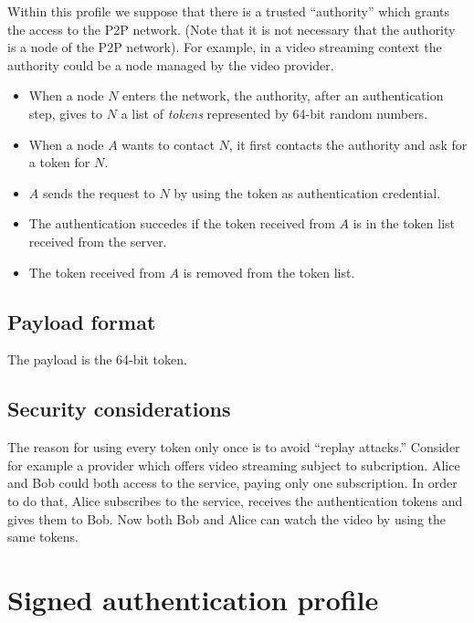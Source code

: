 \documentclass{rfc}
\begin{document}
Within this profile we suppose that there is a trusted ``authority''
which grants the access to the P2P network.  (Note that it is not
necessary that the authority is a node of the P2P network).  For
example, in a video streaming context the authority could be a node
managed by the video provider.

\begin{itemize}
\item
When a node $N$ enters the network, the authority, after an
authentication step, gives to $N$ a list of \emph{tokens} represented
by 64-bit random numbers.  
\item
When a node $A$ wants to contact $N$, it
first contacts the authority and ask for a token for $N$.  
\item
$A$ sends the request to $N$ by using the token as authentication
  credential. 
\item
The authentication succedes if the token received from $A$ is in the
token list received from the server.
\item
The token received from $A$ is removed from the token list.  
\end{itemize}


\section{Payload format}
\label{sect:1.2;transport_layer}

The payload is the 64-bit token.

\section{Security considerations}
\label{sect:1.3;transport_layer}

The reason for using every token only once is to avoid ``replay
attacks.'' Consider for example a provider which offers video
streaming subject to subcription.  Alice and Bob could both access to
the service, paying only one subscription.  In order to do that, Alice
subscribes to the service, receives the authentication tokens and
gives them to Bob.  Now both Bob and Alice can watch the video by
using the same tokens.




\chapter{Signed authentication profile}
\label{chap:2;transport_layer}
\end{document}
